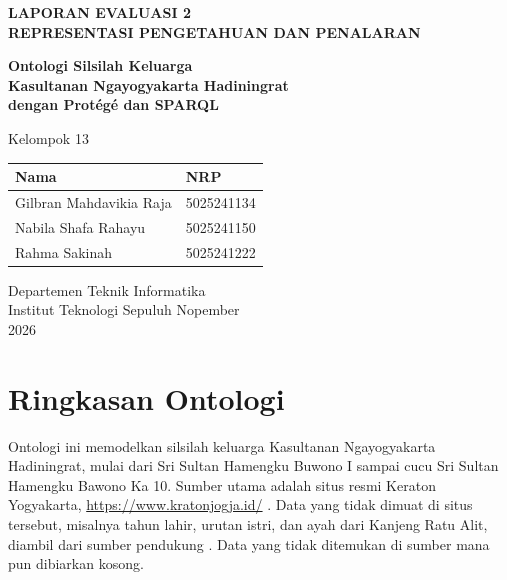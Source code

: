 \documentclass[11pt,a4paper]{article}
\begin{document}
\begin{titlepage}
  \centering
  \vspace*{2cm}
  {\Large\bfseries LAPORAN EVALUASI 2\\[0.3em] REPRESENTASI PENGETAHUAN DAN PENALARAN\par}
  \vspace{1.2cm}
  {\LARGE\bfseries Ontologi Silsilah Keluarga\\[0.2em] Kasultanan Ngayogyakarta Hadiningrat\\[0.2em] dengan Prot\'eg\'e dan SPARQL\par}
  \vspace{2cm}
  {\large Kelompok 13\par}
  \vspace{0.8cm}
  \begin{tabular}{ll}
    \toprule
    \textbf{Nama} & \textbf{NRP} \\
    \midrule
    Gilbran Mahdavikia Raja & 5025241134 \\
    Nabila Shafa Rahayu & 5025241150 \\
    Rahma Sakinah & 5025241222 \\
    \bottomrule
  \end{tabular}
  \vfill
  {\large Departemen Teknik Informatika\\ Institut Teknologi Sepuluh Nopember\\ 2026\par}
\end{titlepage}

\tableofcontents
\newpage

\section*{Ringkasan Ontologi}

Ontologi ini memodelkan silsilah keluarga Kasultanan Ngayogyakarta Hadiningrat, mulai dari Sri Sultan
Hamengku Buwono I sampai cucu Sri Sultan Hamengku Bawono Ka 10. Sumber utama adalah situs resmi Keraton
Yogyakarta, \url{https://www.kratonjogja.id/} \cite{kj-hb1,kj-hb2,kj-hb3,kj-hb4,kj-hb5,kj-hb6,kj-hb7,kj-hb8,kj-hb9,kj-bertakhta,kj-hayu,kj-maduretno,kj-hemas,kj-pepatih,kj-nisaka}.
Data yang tidak dimuat di situs tersebut, misalnya tahun lahir, urutan istri, dan ayah dari Kanjeng Ratu Alit,
diambil dari sumber pendukung \cite{wiki-hb8,wiki-hb9,wiki-hb10,wiki-dipo,wiki-hemas,ra-y6,ra-y7,ra-y8}.
Data yang tidak ditemukan di sumber mana pun dibiarkan kosong.
\end{document}
